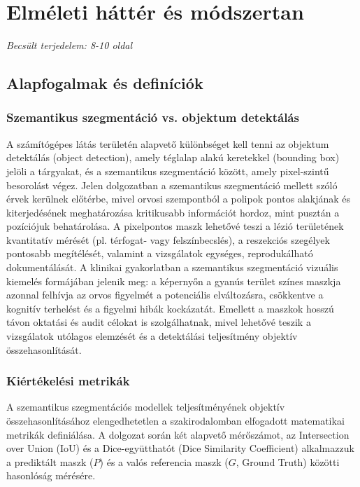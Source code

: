\documentclass[12pt, a4paper]{report}
\begin{document}
\chapter{Elméleti háttér és módszertan}
\textit{Becsült terjedelem: 8-10 oldal}

\section{Alapfogalmak és definíciók}

\subsection{Szemantikus szegmentáció vs. objektum detektálás}
A számítógépes látás területén alapvető különbséget kell tenni az objektum detektálás (object detection), amely téglalap alakú keretekkel (bounding box) jelöli a tárgyakat, és a szemantikus szegmentáció között, amely pixel-szintű besorolást végez. Jelen dolgozatban a szemantikus szegmentáció mellett szóló érvek kerülnek előtérbe, mivel orvosi szempontból a polipok pontos alakjának és kiterjedésének meghatározása kritikusabb információt hordoz, mint pusztán a pozíciójuk behatárolása. A pixelpontos maszk lehetővé teszi a lézió területének kvantitatív mérését (pl. térfogat- vagy felszínbecslés), a reszekciós szegélyek pontosabb megítélését, valamint a vizsgálatok egységes, reprodukálható dokumentálását. A klinikai gyakorlatban a szemantikus szegmentáció vizuális kiemelés formájában jelenik meg: a képernyőn a gyanús terület színes maszkja azonnal felhívja az orvos figyelmét a potenciális elváltozásra, csökkentve a kognitív terhelést és a figyelmi hibák kockázatát. Emellett a maszkok hosszú távon oktatási és audit célokat is szolgálhatnak, mivel lehetővé teszik a vizsgálatok utólagos elemzését és a detektálási teljesítmény objektív összehasonlítását.

\subsection{Kiértékelési metrikák}
A szemantikus szegmentációs modellek teljesítményének objektív összehasonlításához elengedhetetlen a szakirodalomban elfogadott matematikai metrikák definiálása. A dolgozat során két alapvető mérőszámot, az Intersection over Union (IoU) és a Dice-együtthatót (Dice Similarity Coefficient) alkalmazzuk a prediktált maszk ($P$) és a valós referencia maszk ($G$, Ground Truth) közötti hasonlóság mérésére.
\end{document}
